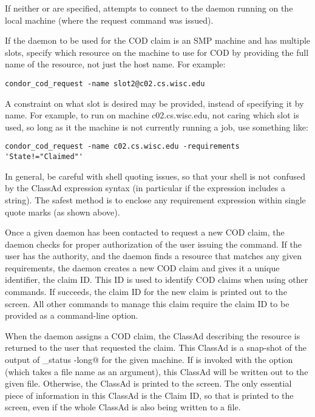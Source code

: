 If neither  or  are specified,
 attempts to connect to the 
daemon running
on the local machine (where the request command was issued).

If the  daemon to be used for the COD claim is an SMP
machine and has multiple slots, specify which resource on
the machine to use for COD by providing the full name of the resource,
not just the host name.
For example:
\begin{verbatim}
condor_cod_request -name slot2@c02.cs.wisc.edu
\end{verbatim}

A constraint on what slot is desired may be provided,
instead of specifying it by name.  
For example, to run on machine c02.cs.wisc.edu,
not caring which slot is used,
so long as it the machine is not currently running a job,
use something like:
\begin{verbatim}
condor_cod_request -name c02.cs.wisc.edu -requirements 'State!="Claimed"'
\end{verbatim}

In general, be careful with shell quoting issues, so that
your shell is not confused by the ClassAd expression syntax (in
particular if the expression includes a string).
The safest method is to enclose any requirement expression
within single quote marks (as shown above).
 
Once a given  daemon has been contacted to request a new COD
claim, the  daemon checks for proper
authorization of the user
issuing the command.
If the user has the authority, and the  daemon
finds a
resource that matches any given requirements,
the  daemon
creates a new COD claim and gives it a unique identifier,
the claim ID.
This ID is used to identify COD claims when using other commands.
If  succeeds, the claim ID for the new claim is printed
out to the screen.
All other commands to manage this claim require the claim ID to be
provided as a command-line option.

When the  daemon assigns a COD claim,
the ClassAd describing the resource is returned to the user that
requested the claim. 
This ClassAd is a snap-shot of 
the output of \verb@condor_status -long@ for the given machine.
If  is invoked with the  option
(which takes a file name as an argument), this ClassAd will be written
out to the given file.
Otherwise, the ClassAd is printed to the screen.
The only essential piece of information in this ClassAd is the Claim
ID, so that is printed to the screen, even if the whole ClassAd is
also being written to a file.

